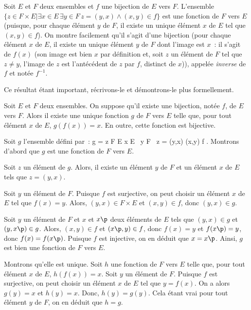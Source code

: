 \blank[medium]

\noindent{} Soit $E$ et $F$ deux ensembles et $f$ une bijection de $E$ vers $F$. 
    L'ensemble $\lbrace z \in F \times E \vert \exists x \in E \, \exists y \in F \, z = (y,x) \wedge (x,y) \in f \rbrace$ est une fonction de $F$ vers $E$ (puisque, pour chaque élément $y$ de $F$, il existe un unique élément $x$ de $E$ tel que $(x,y) \in f$). On montre facilement qu'il s'agit d'une bijection (pour chaque élément $x$ de $E$, il existe un unique élément $y$ de $F$ dont l'image est $x$ : il s'agit de $f(x)$ (son image est bien $x$ par définition et, soit $z$ un élément de $F$ tel que $z \neq y$, l'image de $z$ est l'antécédent de $z$ par $f$, distinct de $x$)), appelée \emph{inverse} de $f$ et notée $f^{-1}$.  

Ce résultat étant important, récrivons-le et démontrons-le plus formellement. 

\blank[medium]

\noindent{} Soit $E$ et $F$ deux ensembles. On suppose qu'il existe une bijection, notée $f$, de $E$ vers $F$. Alors il existe une unique fonction $g$ de $F$ vers $E$ telle que, pour tout élément $x$ de $E$, $g(f(x)) = x$. 
En outre, cette fonction est bijective. 

\blank[medium]

\noindent{}
    Soit $g$ l'ensemble défini par : 
    \startformula
        g = \lbrace z \in F \times E \vert \exists x \in E \, \exists y \in F \, z = (y,x) \wedge (x,y) \in f \rbrace.
    \stopformula
    Montrons d'abord que $g$ est une fonction de $F$ vers $E$. 
    \startitemize[nowhite]
        \item Soit $z$ un élément de $g$. Alors, il existe un élément $y$ de $F$ et un élément $x$ de $E$ tels que $z = (y,x)$.
        \item Soit $y$ un élément de $F$. Puisque $f$ est surjective, on peut choisir un élément $x$ de $E$ tel que $f(x) = y$. 
            Alors, $(y,x) \in F \times E$ et $(x,y) \in f$, donc $(y,x) \in g$. 
        \item Soit $y$ un élément de $F$ et $x$ et $x\p$ deux éléments de $E$ tels que $(y,x) \in g$ et $(y,x\p) \in g$.
            Alors, $(x,y) \in f$ et $(x\p,y) \in f$, donc $f(x) = y$ et $f(x\p) = y$, donc $f(x) = f(x\p)$.
            Puisque $f$ est injective, on en déduit que $x = x\p$.
    \stopitemize
    Ainsi, $g$ est bien une fonction de $F$ vers $E$.

    Montrons qu'elle est unique. 
    Soit $h$ une fonction de $F$ vers $E$ telle que, pour tout élément $x$ de $E$, $h(f(x)) = x$. 
    Soit $y$ un élément de $F$. 
    Puisque $f$ est surjective, on peut choisir un élément $x$ de $E$ tel que $y = f(x)$.
    On a alors $g(y) = x$ et $h(y) = x$. 
    Donc, $h(y) = g(y)$. 
    Cela étant vrai pour tout élément $y$ de $F$, on en déduit que $h = g$.

